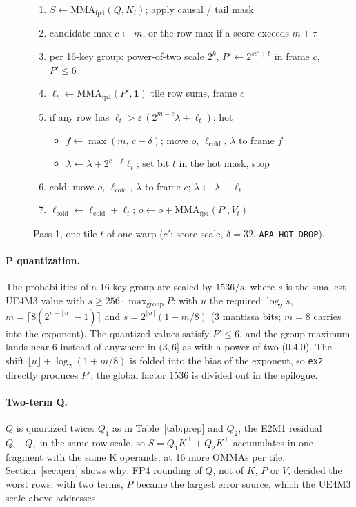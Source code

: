 \documentclass[10pt,twocolumn]{article}
\newcommand{\eps}{\varepsilon}
\newcommand{\code}[1]{\texttt{#1}}
\begin{document}
\begin{figure}[t]
\small
\begin{enumerate}\setlength{\itemsep}{1pt}
\item $S \gets \mathrm{MMA_{fp4}}(Q, K_t)$; apply causal / tail mask
\item candidate max $c \gets m$, or the row max if a score exceeds $m+\tau$
\item per 16-key group: power-of-two scale $2^{k}$, $P' \gets 2^{s c' + b}$ in frame $c$, $P'\le6$
\item $\ell_t \gets \mathrm{MMA_{fp4}}(P', \mathbf{1})$ \hfill tile row sums, frame $c$
\item if any row has $\ell_t > \eps\,(2^{m-c}\lambda+\ell_t)$: hot
  \begin{itemize}\setlength{\itemsep}{0pt}
  \item $f \gets \max(m,\, c-\delta)$; move $o$, $\ell_{\text{cold}}$, $\lambda$ to frame $f$
  \item $\lambda \gets \lambda + 2^{c-f}\ell_t$; set bit $t$ in the hot mask, stop
  \end{itemize}
\item cold: move $o$, $\ell_{\text{cold}}$, $\lambda$ to frame $c$; $\lambda \gets \lambda+\ell_t$
\item $\ell_{\text{cold}} \gets \ell_{\text{cold}} + \ell_t$;\; $o \gets o + \mathrm{MMA_{fp4}}(P', V_t)$
\end{enumerate}
\caption{Pass 1, one tile $t$ of one warp ($c'$: score scale, $\delta=32$, \code{APA\_HOT\_DROP}).}
\label{alg:pass1}
\end{figure}

\paragraph{P quantization.} The probabilities of a 16-key group are scaled by $1536/s$, where $s$ is the smallest
UE4M3 value with $s\ge256\cdot\max_{\text{group}}P$: with $u$ the required $\log_2 s$, $m=\lceil 8(2^{u-\lfloor u\rfloor}-1)\rceil$
and $s=2^{\lfloor u\rfloor}(1+m/8)$ (3 mantissa bits; $m=8$ carries into the exponent). The quantized values satisfy
$P'\le6$, and the group maximum lands near 6 instead of anywhere in $(3,6]$ as with a power of two (0.4.0). The
shift $\lfloor u\rfloor+\log_2(1+m/8)$ is folded into the bias of the exponent, so \code{ex2} directly produces $P'$;
the global factor 1536 is divided out in the epilogue.

\paragraph{Two-term Q.} $Q$ is quantized twice: $Q_1$ as in Table~\ref{tab:prep} and $Q_2$, the E2M1 residual $Q-Q_1$ in the
same row scale, so $S=Q_1K^\top+Q_2K^\top$ accumulates in one fragment with the same K operands, at 16 more OMMAs
per tile. Section~\ref{sec:qerr} shows why: FP4 rounding of $Q$, not of $K$, $P$ or $V$, decided the worst rows;
with two terms, $P$ became the largest error source, which the UE4M3 scale above addresses.
\end{document}
